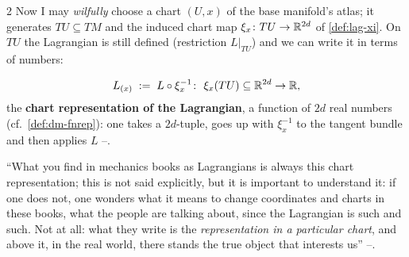 \begin{paracol}{2}
Now I may \emph{wilfully} choose a chart $(U,x)$ of the base manifold's atlas; it generates $TU\subseteq TM$ and the induced chart map $\xi_x\colon TU\to\mathbb{R}^{2d}$ of \cref{def:lag-xi}. On $TU$ the Lagrangian is still defined (restriction $L|_{TU}$) and we can write it in terms of numbers:

\begin{definition}\label{def:lag-Lchart}
\begin{equation}\label{eq:lag-Lchart}
  L_{(x)}\;:=\;L\circ\xi_x^{-1}\colon\ \xi_x(TU)\subseteq\mathbb{R}^{2d}\to\mathbb{R} ,
\end{equation}
the \textbf{chart representation of the Lagrangian}, a function of $2d$ real numbers (cf.\ \cref{def:dm-fnrep}): one takes a $2d$-tuple, goes up with $\xi_x^{-1}$ to the tangent bundle and then applies $L$ --.
\end{definition}
``What you find in mechanics books as Lagrangians is always this chart representation; this is not said explicitly, but it is important to understand it: if one does not, one wonders what it means to change coordinates and charts in these books, what the people are talking about, since the Lagrangian is such and such. Not at all: what they write is the \emph{representation in a particular chart}, and above it, in the real world, there stands the true object that interests us'' --.


\end{paracol}
